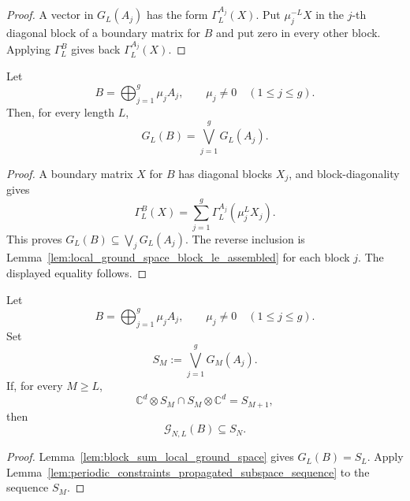 \begin{proof}
    \leanok
    A vector in \(G_L(A_j)\) has the form \(\Gamma_L^{A_j}(X)\).  Put
    \(\mu_j^{-L}X\) in the \(j\)-th diagonal block of a boundary matrix for
    \(B\) and put zero in every other block.  Applying \(\Gamma_L^B\) gives
    back \(\Gamma_L^{A_j}(X)\).
\end{proof}

\begin{lemma}
    \label{lem:block_sum_local_ground_space}
    \leanok
    Let
    \[
        B=\bigoplus_{j=1}^g\mu_jA_j,
        \qquad
        \mu_j\ne0\quad(1\le j\le g).
    \]
    Then, for every length \(L\),
    \[
        G_L(B)=\bigvee_{j=1}^gG_L(A_j).
    \]
\end{lemma}

\begin{proof}
    \leanok
    A boundary matrix \(X\) for \(B\) has diagonal blocks \(X_j\), and
    block-diagonality gives
    \[
        \Gamma_L^B(X)
        =
        \sum_{j=1}^g\Gamma_L^{A_j}(\mu_j^LX_j).
    \]
    This proves \(G_L(B)\subseteq\bigvee_jG_L(A_j)\). The reverse inclusion is
    Lemma~\ref{lem:local_ground_space_block_le_assembled} for each block \(j\).
    The displayed equality follows.
\end{proof}

\begin{lemma}
    \label{lem:block_diagonal_periodic_constraints_propagated_sum}
    \leanok
    Let
    \[
        B=\bigoplus_{j=1}^g\mu_jA_j,
        \qquad \mu_j\ne0\quad(1\le j\le g).
    \]
    Set
    \[
        S_M:=\bigvee_{j=1}^gG_M(A_j).
    \]
    If, for every \(M\ge L\),
    \[
        \mathbb C^d\otimes S_M\cap S_M\otimes\mathbb C^d=S_{M+1},
    \]
    then
    \[
        \mathcal G_{N,L}(B)\subseteq S_N.
    \]
\end{lemma}

\begin{proof}
    \leanok
    Lemma~\ref{lem:block_sum_local_ground_space} gives \(G_L(B)=S_L\).
    Apply Lemma~\ref{lem:periodic_constraints_propagated_subspace_sequence}
    to the sequence \(S_M\).
\end{proof}

